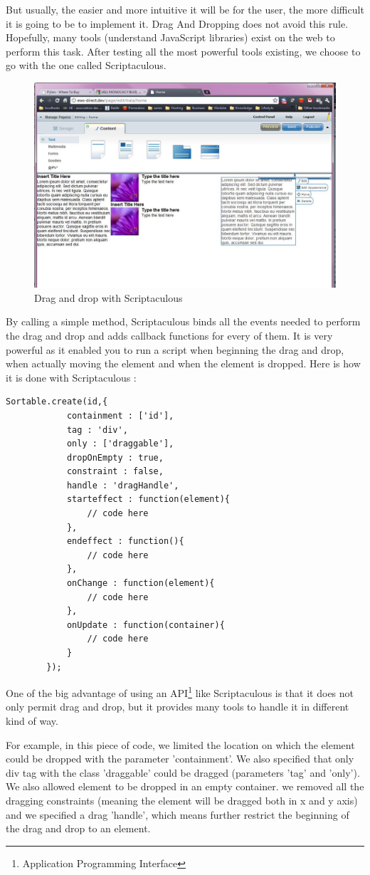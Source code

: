 But usually, the easier and more intuitive it will be for the user, the more difficult it is going to be to implement it. Drag And Dropping does not avoid this rule. Hopefully, many tools (understand JavaScript libraries) exist on the web to perform this task. After testing all the most powerful tools existing, we choose to go with the one called Scriptaculous. 

\begin{figure}[h!]
\centering
\includegraphics[width=.55\textwidth]{img/ews_drag.jpg}
\caption{Drag and drop with Scriptaculous}
\label{figure:ews_drag}
\end{figure}

By calling a simple method, Scriptaculous binds all the events needed to perform the drag and drop and adds callback functions for every of them. It is very powerful as it enabled you to run a script when beginning the drag and drop, when actually moving the element and when the element is dropped.
Here is how it is done with Scriptaculous :


 \lstset{language=Javascript}
\begin{lstlisting}[label=scriptaculous,caption=Drag And Dropping with scriptaculous]
Sortable.create(id,{
			containment : ['id'],
			tag : 'div',
			only : ['draggable'],
			dropOnEmpty : true,
			constraint : false,
			handle : 'dragHandle',
			starteffect : function(element){
				// code here
			},
			endeffect : function(){
				// code here
			},
			onChange : function(element){
				// code here
			},
			onUpdate : function(container){	
				// code here
			}
		});
\end{lstlisting}

One of the big advantage of using an API\footnote{Application Programming Interface} like Scriptaculous is that it does not only permit drag and drop, but it provides many tools to handle it in different kind of way. 

For example, in this piece of code, we limited the location on which the element could be dropped with the parameter 'containment'. We also specified that only div tag with the class 'draggable' could be dragged (parameters 'tag' and 'only'). We also allowed element to be dropped in an empty container. we removed all the dragging constraints (meaning the element will be dragged both in x and y axis) and we specified a drag 'handle', which means further restrict the beginning of the drag and drop to an element.

